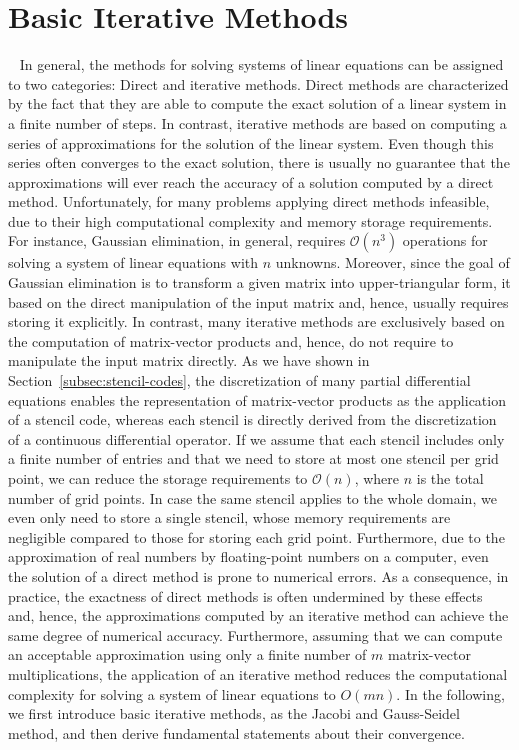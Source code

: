 \section{Basic Iterative Methods}~\label{sec:basic-iterative-methods}
In general, the methods for solving systems of linear equations can be assigned to two categories: Direct and iterative methods.
Direct methods are characterized by the fact that they are able to compute the exact solution of a linear system in a finite number of steps.
In contrast, iterative methods are based on computing a series of approximations for the solution of the linear system.
Even though this series often converges to the exact solution, there is usually no guarantee that the approximations will ever reach the accuracy of a solution computed by a direct method.
Unfortunately, for many problems applying direct methods infeasible, due to their high computational complexity and memory storage requirements.
For instance, Gaussian elimination, in general, requires $\mathcal O(n^3)$ operations for solving a system of linear equations with $n$ unknowns.
Moreover, since the goal of Gaussian elimination is to transform a given matrix into upper-triangular form, it based on the direct manipulation of the input matrix and, hence, usually requires storing it explicitly.
In contrast, many iterative methods are exclusively based on the computation of matrix-vector products and, hence, do not require to manipulate the input matrix directly.
As we have shown in Section~\ref{subsec:stencil-codes}, the discretization of many partial differential equations enables the representation of matrix-vector products as the application of a stencil code, whereas each stencil is directly derived from the discretization of a continuous differential operator.
If we assume that each stencil includes only a finite number of entries and that we need to store at most one stencil per grid point, we can reduce the storage requirements to $\mathcal{O}(n)$, where $n$ is the total number of grid points.
In case the same stencil applies to the whole domain, we even only need to store a single stencil, whose memory requirements are negligible compared to those for storing each grid point.
Furthermore, due to the approximation of real numbers by floating-point numbers on a computer, even the solution of a direct method is prone to numerical errors.
As a consequence, in practice, the exactness of direct methods is often undermined by these effects and, hence, the approximations computed by an iterative method can achieve the same degree of numerical accuracy.%
Furthermore, assuming that we can compute an acceptable approximation using only a finite number of $m$ matrix-vector multiplications, the application of an iterative method reduces the computational complexity for solving a system of linear equations to $O(mn)$.
In the following, we first introduce basic iterative methods, as the Jacobi and Gauss-Seidel method, and then derive fundamental statements about their convergence. 

